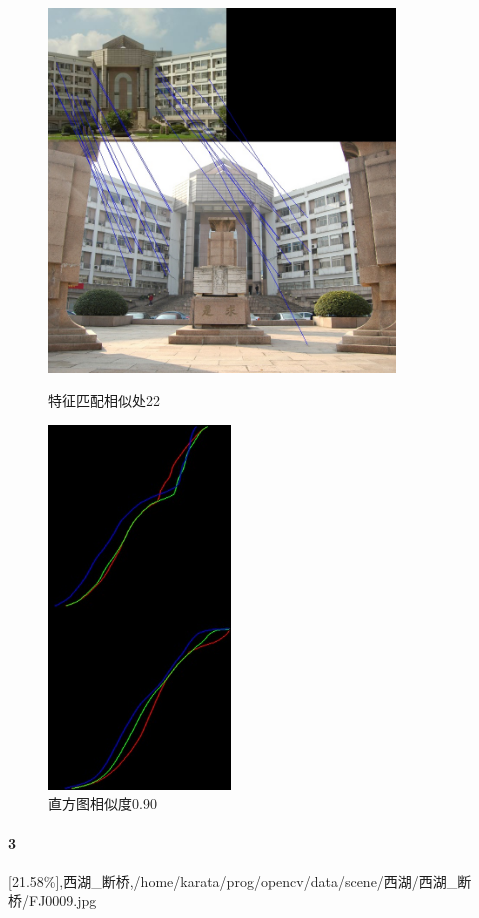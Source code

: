 \begin{figure}[htb]
\begin{minipage}[t]{0.5\linewidth}
\centering
\includegraphics[height=3.8in]{玉泉曹楼.jpg.d/im2sift.jpg}
\caption{特征匹配相似处22}
\label{fig:side:a}
\end{minipage}%
\begin{minipage}[t]{0.5\linewidth}
\centering
\includegraphics[height=3.8in]{玉泉曹楼.jpg.d/im2hist2.jpg}
\caption{直方图相似度0.90}
\label{fig:side:a}
\end{minipage}%
\end{figure}

\paragraph{3}
[21.58\%],西湖\_断桥,/home/karata/prog/opencv/data/scene/西湖/西湖\_断桥/FJ0009.jpg

